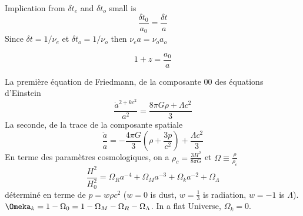 Implication from $\delta t_e$ and $\delta t_o$ small is
\begin{equation}\label{eq:}
       \frac{\delta t_0}{a_0}  = \frac{\delta t}{a}
\end{equation} 
Since $\delta t = 1/\nu_e$ et $\delta t_o = 1/\nu_o$ then $\nu_e a = \nu_o a_o$

\begin{equation}\label{eq:}
        1  + z = \frac{a_0}{a}
\end{equation} 

La première équation de Friedmann, de la composante $00$ des équations d'Einstein
\begin{equation}\label{eq:Friedmann1}
        \frac{\dot{a}^{2 + kc^2}}{a^{2}} = \frac{8 \pi G \rho + \Lambda c^2}{3}
\end{equation} 
La seconde, de la trace de la composante spatiale
\begin{equation}\label{eq:Friedmann}
        \frac{\ddot{a}}{a} = -\frac{4 \pi G}{3} \left( \rho + \frac{3p}{c^{2}} \right) + \frac{\Lambda c^{2}}{3}
\end{equation} 
En terme des paramètres cosmologiques, on a $\rho_c = \frac{3H^{2}}{8 \pi G}$ et $\Omega \equiv \frac{\rho}{\rho_c}$
\begin{equation}\label{eq:}
        \frac{H^{2}}{H_0^{2}} = \Omega_{R} a^{-4} + \Omega_M a^{-3} + \Omega_k a^{-2} + \Omega_\Lambda
\end{equation} 
déterminé en terme de $p = w \rho c^{2}$ ($w = 0$ is dust, $w = \frac{1}{3}$ is radiation, $w = -1$ is $\Lambda$). 
$\Omeka_k = 1 - \Omega_0 = 1 - \Omega_M - \Omega_R - \Omega_\Lambda$. In a flat Universe, $\Omega_k = 0$.




